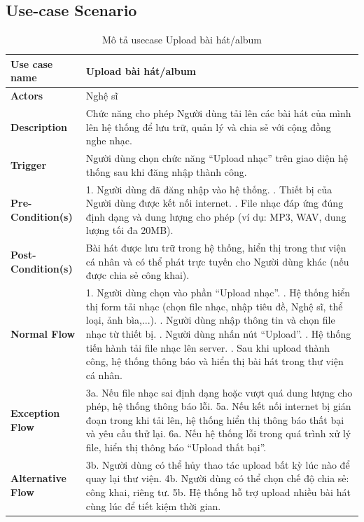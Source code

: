 \documentclass[a4paper]{article}
\begin{document}
\subsection{Use-case Scenario}
\begin{table}[h!]
\centering
\renewcommand{\arraystretch}{1.3} %
\begin{tabularx}{\textwidth}{|l|X|}
\hline
\textbf{Use case name} & Upload bài hát/album \\ \hline
\textbf{Actors}        & Nghệ sĩ \\ \hline
\textbf{Description}   & Chức năng cho phép Người dùng tải lên các bài hát của mình lên hệ thống để lưu trữ, quản lý và chia sẻ với cộng đồng nghe nhạc. \\ \hline
\textbf{Trigger}       & Người dùng chọn chức năng “Upload nhạc” trên giao diện hệ thống sau khi đăng nhập thành công. \\ \hline
\textbf{Pre-Condition(s)} 
& 1. Người dùng đã đăng nhập vào hệ thống. \newline
  2. Thiết bị của Người dùng được kết nối internet. \newline
  3. File nhạc đáp ứng đúng định dạng và dung lượng cho phép (ví dụ: MP3, WAV, dung lượng tối đa 20MB). \\ \hline
\textbf{Post-Condition(s)} 
& Bài hát được lưu trữ trong hệ thống, hiển thị trong thư viện cá nhân và có thể phát trực tuyến cho Người dùng khác (nếu được chia sẻ công khai). \\ \hline
\textbf{Normal Flow}   
& 1. Người dùng chọn vào phần “Upload nhạc”. \newline
  2. Hệ thống hiển thị form tải nhạc (chọn file nhạc, nhập tiêu đề, Nghệ sĩ, thể loại, ảnh bìa,...). \newline
  3. Người dùng nhập thông tin và chọn file nhạc từ thiết bị. \newline
  4. Người dùng nhấn nút “Upload”. \newline
  5. Hệ thống tiến hành tải file nhạc lên server. \newline
  6. Sau khi upload thành công, hệ thống thông báo và hiển thị bài hát trong thư viện cá nhân. \\ \hline
\textbf{Exception Flow} 
& 3a. Nếu file nhạc sai định dạng hoặc vượt quá dung lượng cho phép, hệ thống thông báo lỗi. \newline
  5a. Nếu kết nối internet bị gián đoạn trong khi tải lên, hệ thống hiển thị thông báo thất bại và yêu cầu thử lại. \newline
  6a. Nếu hệ thống lỗi trong quá trình xử lý file, hiển thị thông báo “Upload thất bại”. \\ \hline
\textbf{Alternative Flow} 
& 3b. Người dùng có thể hủy thao tác upload bất kỳ lúc nào để quay lại thư viện. \newline
  4b. Người dùng có thể chọn chế độ chia sẻ: công khai, riêng tư. \newline
  5b. Hệ thống hỗ trợ upload nhiều bài hát cùng lúc để tiết kiệm thời gian. \\ \hline
\end{tabularx}
\caption{Mô tả usecase Upload bài hát/album}
\end{table}
\end{document}

